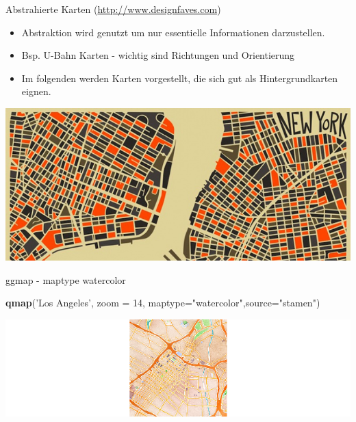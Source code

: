 \documentclass[ignorenonframetext,]{beamer}
\newenvironment{Shaded}{\begin{snugshade}}{\end{snugshade}}
\newcommand{\DataTypeTok}[1]{\textcolor[rgb]{0.13,0.29,0.53}{#1}}
\newcommand{\DecValTok}[1]{\textcolor[rgb]{0.00,0.00,0.81}{#1}}
\newcommand{\KeywordTok}[1]{\textcolor[rgb]{0.13,0.29,0.53}{\textbf{#1}}}
\newcommand{\NormalTok}[1]{#1}
\newcommand{\StringTok}[1]{\textcolor[rgb]{0.31,0.60,0.02}{#1}}
\providecommand{\tightlist}{%
  \setlength{\itemsep}{0pt}\setlength{\parskip}{0pt}}
\begin{document}
\begin{frame}{Abstrahierte Karten
(\href{http://www.designfaves.com/2014/03/abstracted-maps-reveal-cities-personalities}{http://www.designfaves.com})}
\protect\hypertarget{abstrahierte-karten-httpwww.designfaves.com}{}

\begin{itemize}
\tightlist
\item
  Abstraktion wird genutzt um nur essentielle Informationen
  darzustellen.
\item
  Bsp. U-Bahn Karten - wichtig sind Richtungen und Orientierung
\item
  Im folgenden werden Karten vorgestellt, die sich gut als
  Hintergrundkarten eignen.
\end{itemize}

\includegraphics{figure/NYabstracted.jpg}

\end{frame}

\begin{frame}[fragile]{ggmap - maptype watercolor}
\protect\hypertarget{ggmap---maptype-watercolor}{}

\begin{Shaded}
\begin{Highlighting}[]
\KeywordTok{qmap}\NormalTok{(}\StringTok{'Los Angeles'}\NormalTok{, }\DataTypeTok{zoom =} \DecValTok{14}\NormalTok{,}
 \DataTypeTok{maptype=}\StringTok{"watercolor"}\NormalTok{,}\DataTypeTok{source=}\StringTok{"stamen"}\NormalTok{)}
\end{Highlighting}
\end{Shaded}

\includegraphics{figure/lastamen.png}

\end{frame}
\end{document}
